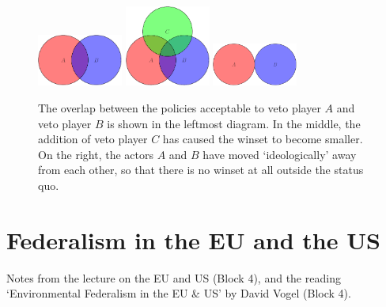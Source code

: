 \begin{figure}[H]
  \begin{center}
    \includegraphics[width=0.25\textwidth]{veto-players-1.pdf}
    \includegraphics[width=0.25\textwidth]{veto-players-2.pdf}
    \includegraphics[width=0.25\textwidth]{veto-players-3.pdf}
  \end{center}
  \caption{The overlap between the policies acceptable to veto player
    $A$ and veto player $B$ is shown in the leftmost diagram. In the
    middle, the addition of veto player $C$ has caused the winset to
    become smaller. On the right, the actors $A$ and $B$ have moved
    `ideologically' away from each other, so that there is no winset
    at all outside the status quo.}
\end{figure}


\section{Federalism in the EU and the US}
\begin{flushright}
  \scriptsize Notes from the lecture on the EU and US (Block 4), and
  the reading `Environmental Federalism in the EU \& US' by David
  Vogel (Block 4).
\end{flushright}


